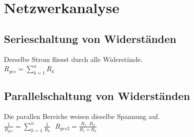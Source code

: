 \section{Netzwerkanalyse}

\begin{minipage}{8.5cm}
\subsection{Serieschaltung von Widerständen}
Derselbe Strom fliesst durch alle Widerstände.\\
$ R_{ges} = \sum\limits_{k=1}^{n}{R_k} $ \\
\end{minipage}
\begin{minipage}{8.5cm}
\subsection{Parallelschaltung von Widerständen}
Die parallen Bereiche weisen dieselbe Spannung auf.\\
$ \frac{1}{R_{ges}} = \sum\limits_{k=1}^{n}\frac{1}{R_k}\ \ \ R_{ges2} = \frac{R_1 \cdot R_2}{R_1 + R_2} $ \\
\end{minipage}

